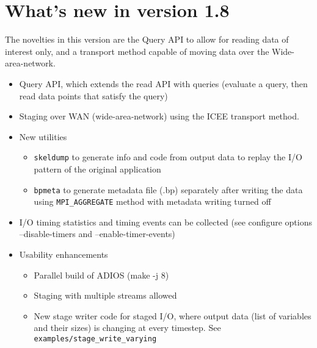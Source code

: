 \section {What's new in version 1.8}
The novelties in this version are the Query API to allow for reading data of interest only, and a transport method capable of moving data over the Wide-area-network.  
\begin{itemize}
\item Query API, which extends the read API with queries (evaluate a query, then read data points that satisfy the query)
\item Staging over WAN (wide-area-network) using the ICEE transport method. 
           
\item New utilities
    \begin{itemize}
    \item \verb+skeldump+ to generate info and code from output data to replay the I/O pattern of the original application
    \item \verb+bpmeta+ to generate metadata file (.bp) separately after writing the data using \verb+MPI_AGGREGATE+ method with metadata writing turned off
    \end{itemize}

\item I/O timing statistics and timing events can be collected (see configure options --disable-timers and --enable-timer-events)

\item Usability enhancements
    \begin{itemize}
    \item Parallel build of ADIOS (make -j 8)
    \item Staging with multiple streams allowed
    \item New stage writer code for staged I/O, where output data (list of variables and their sizes) is changing at every timestep. See \verb+examples/stage_write_varying+
    \end{itemize}
     
\end{itemize}


